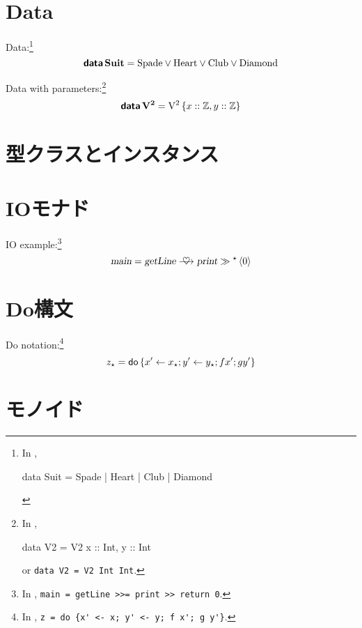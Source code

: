 \documentclass[platex,a5paper,twoside,fleqn,draft]{jsbook}
\begin{document}
\section{Data}

Data:\footnote{In \haskell,
\begin{footcode}
data Suit = Spade | Heart | Club | Diamond
\end{footcode}}
\begin{equation}
\mathop{\textbf{\textsf{data}}}\mathbf{Suit}=\mathord{\mathrm{Spade}}\vee\mathord{\mathrm{Heart}}\vee\mathord{\mathrm{Club}}\vee\mathord{\mathrm{Diamond}}
\end{equation}

Data with parameters:\footnote{In \haskell,
\begin{footcode}
data V2 = V2 { x :: Int, y :: Int}
\end{footcode}
or \verb|data V2 = V2 Int Int|.}
\begin{equation}
\mathop{\textbf{\textsf{data}}}\mathbf{V^2}=\mathord{\mathrm{V^2}}\left\{x::\mathord{\mathbb{Z}},y::\mathord{\mathbb{Z}}\right\}
\end{equation}

\section{型クラスとインスタンス}

\section{IOモナド}

IO example:\footnote{In \haskell, \verb|main = getLine >>= print >> return 0|.}
\begin{equation}
\mathMain=\mathGetLine\mathBindRight\mathPrint\mathNext\mathMakeReturn{0}
\end{equation}

\section{Do構文}

Do notation:\footnote{In \haskell, \verb|z = do {x' <- x; y' <- y; f x'; g y'}|.}
\begin{equation}
z_\star=\mathord{\textsf{do}}\left\{x'\leftarrow x_\star;y'\leftarrow y_\star;fx';gy'\right\}
\end{equation}

\dbend

\section{モノイド}
\end{document}
